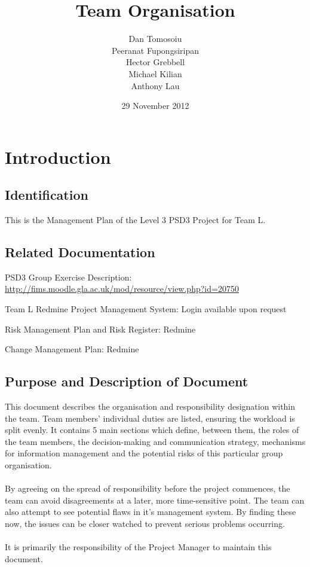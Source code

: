 \documentclass{l3deliverable}
\title{Team Organisation}
\author{
  Dan Tomosoiu \\
  Peeranat Fupongsiripan \\
  Hector Grebbell \\
  Michael Kilian \\
  Anthony Lau \\
}
\date{29 November 2012}
\begin{document}

\maketitle


\section{Introduction}

\subsection{Identification}

This is the Management Plan of the Level 3 PSD3 Project for Team L.

\subsection{Related Documentation}

\begin{list}{}{}
\item{PSD3 Group Exercise Description: \url{http://fims.moodle.gla.ac.uk/mod/resource/view.php?id=20750}}
\item{Team L Redmine Project Management System: Login available upon request}
\item{Risk Management Plan and Risk Register: Redmine}
\item{Change Management Plan: Redmine}
\end{list}
 

\subsection{Purpose and Description of Document}
This document describes the organisation and responsibility designation within the team. Team members' individual duties are listed, ensuring the workload is split evenly. It contains 5 main sections which define, between them, the roles of the team members, the decision-making and communication strategy, mechanisms for information management and the potential risks of this particular group organisation. \\
\\
By agreeing on the spread of responsibility before the project commences, the team can avoid disagreements at a later, more time-sensitive point. The team can also attempt to see potential flaws in it's management system. By finding these now, the issues can be closer watched to prevent serious problems occurring.\\
\\
It is primarily the responsibility of the Project Manager to maintain this document.
\end{document}
